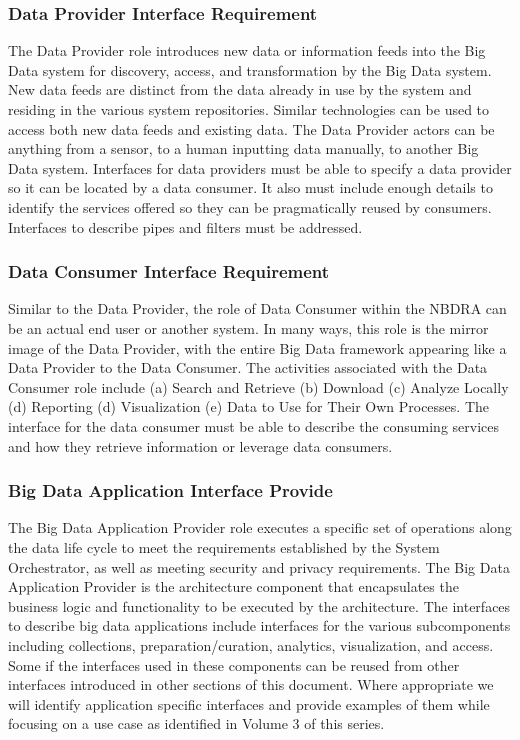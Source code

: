\documentclass[10pt]{article}
\begin{document}
\subsubsection{Data Provider Interface Requirement}

The Data Provider role introduces new data or information feeds into
the Big Data system for discovery, access, and transformation by the
Big Data system. New data feeds are distinct from the data already in
use by the system and residing in the various system repositories.
Similar technologies can be used to access both new data feeds and
existing data. The Data Provider actors can be anything from a sensor,
to a human inputting data manually, to another Big Data system.
Interfaces for data providers must be able to specify a data provider
so it can be located by a data consumer. It also must include enough
details to identify the services offered so they can be pragmatically
reused by consumers. Interfaces to describe pipes and filters must be
addressed.

\subsubsection{Data Consumer Interface Requirement}

Similar to the Data Provider, the role of Data Consumer within the
NBDRA can be an actual end user or another system. In many ways, this
role is the mirror image of the Data Provider, with the entire Big
Data framework appearing like a Data Provider to the Data Consumer.
The activities associated with the Data Consumer role include (a)
Search and Retrieve (b) Download (c) Analyze Locally (d) Reporting (d)
Visualization (e) Data to Use for Their Own Processes. The interface
for the data consumer must be able to describe the consuming services
and how they retrieve information or leverage data consumers.

\subsubsection{Big Data Application Interface Provide}

The Big Data Application Provider role executes a specific set of
operations along the data life cycle to meet the requirements
established by the System Orchestrator, as well as meeting security
and privacy requirements. The Big Data Application Provider is the
architecture component that encapsulates the business logic and
functionality to be executed by the architecture. The interfaces to
describe big data applications include interfaces for the various
subcomponents including collections, preparation/curation, analytics,
visualization, and access. Some if the interfaces used in these
components can be reused from other interfaces introduced in other
sections of this document. Where appropriate we will identify
application specific interfaces and provide examples of them while
focusing on a use case as identified in Volume 3 of this series.
\end{document}
